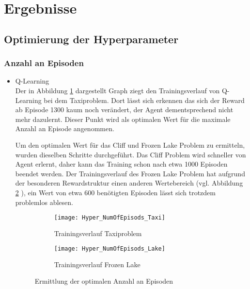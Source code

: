 \section{Ergebnisse}

\subsection{Optimierung der Hyperparameter}

\subsubsection{Anzahl an Episoden}
\begin{itemize}
    \item Q-Learning\\
    Der in Abbildung \ref{fig:NumOfEpisods_Taxi} dargestellt Graph ziegt den Trainingsverlauf von Q-Learning bei dem Taxiproblem. Dort lässt sich erkennen das sich der Reward ab Episode 1300 kaum noch verändert, der Agent dementsprechend nicht mehr dazulernt. 
    Dieser Punkt wird als optimalen Wert für die maximale Anzahl an Episode angenommen.

    Um den optimalen Wert für das Cliff und Frozen Lake Problem zu ermitteln, wurden dieselben Schritte durchgeführt.
    Das Cliff Problem wird schneller von Agent erlernt, daher kann das Training schon nach etwa 1000 Episoden beendet werden.
    Der Trainingsverlauf des Frozen Lake Problem hat aufgrund der besonderen Rewardstruktur einen anderen Wertebereich (vgl. Abbildung \ref{fig:NumOfEpisods_Lake} ), ein Wert von etwa 600 benötigten Episoden lässt sich trotzdem problemlos ablesen.
    
    \begin{figure}[H]
      \centering
      \begin{subfigure}{.5\textwidth}
        \centering
        \texttt{[image: Hyper\_NumOfEpisods\_Taxi]}
        \caption{Trainingsverlauf Taxiproblem}
        \label{fig:NumOfEpisods_Taxi}
      \end{subfigure}%
      \begin{subfigure}{.5\textwidth}
        \centering
        \texttt{[image: Hyper\_NumOfEpisods\_Lake]}
        \caption{Trainingsverlauf Frozen Lake}
        \label{fig:NumOfEpisods_Lake}
      \end{subfigure}
      \caption{Ermittlung der optimalen Anzahl an Episoden}
      \label{fig:NumOfEpisods_Taxi_Q-Learning}
  \end{figure}


\end{itemize}
